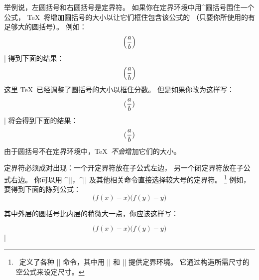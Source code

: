 {{{{{{%
举例说，左圆括号和右圆括号是定界符。
如果你在定界环境中用^{圆括号}围住一个公式，
\TeX\ 将增加圆括号的大小以让它们框住包含该公式的%
（只要你所使用的有足够大的圆括号）。
例如：
\csdisplay
$$ \left( a \over b \right) $$
|
得到下面的结果：
\centereddisplays $$\left (a \over b \right ) $$
这里 \TeX\ 已经调整了圆括号的大小以框住分数。
但是如果你改为这样写：
\csdisplay
$$({a \over b})$$
|
将会得到下面的结果：
$$({a \over b})$$
由于圆括号不在定界环境中，\TeX\ \emph{不会}增加它们的大小。

定界符必须成对出现：一个开定界符放在子公式左边，
另一个闭定界符放在子公式右边。
你可以用 ^|\bigl|，^|\bigr| 及其他相关命令\ctsref{\bigl}直接选择较大号的定界符。
\footnote
{\PlainTeX\ 定义了各种 |\big| 命令，其中用 |\left| 和 |\right| 提供定界环境。
它通过构造所需尺寸的空公式来设定尺寸。}
例如，要得到下面的陈列公式：
$$\bigl(f(x) - x \bigr) \bigl(f(y) - y \bigr)$$

\noindent 其中外层的圆括号比内层的稍微大一点，你应该这样写：

\csdisplay
$$\bigl( f(x) - x \bigr) \bigl( f(y) - y \bigr)$$
|

}}}}}}
